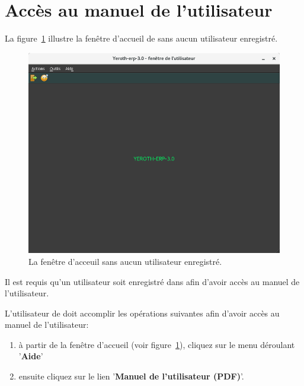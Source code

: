 \newpage

\section{Acc\`es au manuel de l'utilisateur}

La figure~\ref{fig:fenetre-principale-utilisateur-non-enregistre}
illustre la fen\^etre d'accueil de \yeren sans aucun utilisateur
enregistr\'e.\\

\begin{figure}[!htbp]
\centering
\includegraphics[scale=0.63]{images/yeren-fenetre-principale.png}
\caption{La fen\^etre d'acceuil sans aucun utilisateur enregistr\'e.}
\label{fig:fenetre-principale-utilisateur-non-enregistre}
\end{figure}

Il est requis qu'un utilisateur soit enregistr\'e
dans \yeren afin d'avoir acc\`es au manuel de l'utilisateur.

L'utilisateur de \yeren doit accomplir les op\'erations
suivantes afin d'avoir acc\`es au manuel de l'utilisateur:
\begin{enumerate}[1)]
	\item \`a partir de la fen\^etre d'accueil
		(voir figure~\ref{fig:fenetre-principale-utilisateur-non-enregistre}),
		cliquez sur le menu d\'eroulant '\textbf{Aide}'
	\item ensuite cliquez sur le lien '\textbf{Manuel de l'utilisateur (PDF)}'.
\end{enumerate}

